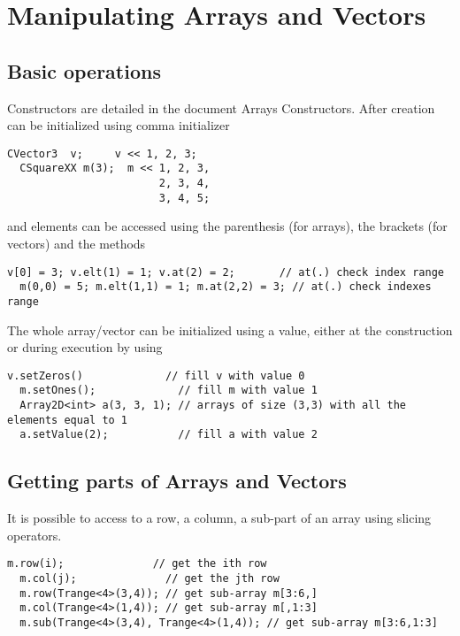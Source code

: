 \documentclass[a4paper,10pt]{article}
\begin{document}
\section{Manipulating Arrays and Vectors}

\subsection{Basic operations}
Constructors are detailed in the document Arrays Constructors.
After creation  can be initialized using comma initializer
\begin{lstlisting}[style=customcpp]
  CVector3  v;     v << 1, 2, 3;
  CSquareXX m(3);  m << 1, 2, 3,
                        2, 3, 4,
                        3, 4, 5;
\end{lstlisting}
and elements can be accessed using the parenthesis (for arrays), the brackets
(for vectors) and the  methods
\begin{lstlisting}[style=customcpp]
  v[0] = 3; v.elt(1) = 1; v.at(2) = 2;       // at(.) check index range
  m(0,0) = 5; m.elt(1,1) = 1; m.at(2,2) = 3; // at(.) check indexes range
\end{lstlisting}

The whole array/vector can be initialized using a value, either at the construction
or during execution by using
\begin{lstlisting}[style=customcpp]
  v.setZeros()             // fill v with value 0
  m.setOnes();             // fill m with value 1
  Array2D<int> a(3, 3, 1); // arrays of size (3,3) with all the elements equal to 1
  a.setValue(2);           // fill a with value 2
\end{lstlisting}

\subsection{Getting parts of Arrays and Vectors}

It is possible to access to a row, a column, a sub-part of an array using
slicing operators.

\begin{lstlisting}[style=customcpp,caption=Slicing]
  m.row(i);              // get the ith row
  m.col(j);              // get the jth row
  m.row(Trange<4>(3,4)); // get sub-array m[3:6,]
  m.col(Trange<4>(1,4)); // get sub-array m[,1:3]
  m.sub(Trange<4>(3,4), Trange<4>(1,4)); // get sub-array m[3:6,1:3]
\end{lstlisting}
\end{document}
